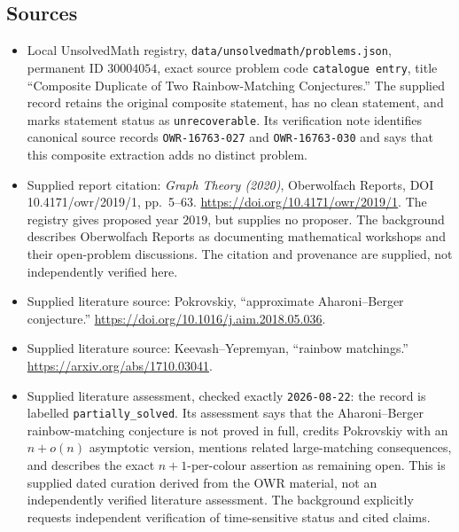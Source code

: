 \documentclass[11pt]{article}
\begin{document}
\subsection{Sources}
\begin{itemize}
\item Local UnsolvedMath registry, \texttt{data/unsolvedmath/problems.json}, permanent ID \(30004054\), exact source problem code \texttt{catalogue entry}, title ``Composite Duplicate of Two Rainbow-Matching Conjectures.'' The supplied record retains the original composite statement, has no clean statement, and marks statement status as \texttt{unrecoverable}. Its verification note identifies canonical source records \texttt{OWR-16763-027} and \texttt{OWR-16763-030} and says that this composite extraction adds no distinct problem.
\item Supplied report citation: \emph{Graph Theory (2020)}, Oberwolfach Reports, DOI 10.4171/owr/2019/1, pp.~5--63. \url{https://doi.org/10.4171/owr/2019/1}. The registry gives proposed year \(2019\), but supplies no proposer. The background describes Oberwolfach Reports as documenting mathematical workshops and their open-problem discussions. The citation and provenance are supplied, not independently verified here.
\item Supplied literature source: Pokrovskiy, ``approximate Aharoni--Berger conjecture.'' \url{https://doi.org/10.1016/j.aim.2018.05.036}.
\item Supplied literature source: Keevash--Yepremyan, ``rainbow matchings.'' \url{https://arxiv.org/abs/1710.03041}.
\item Supplied literature assessment, checked exactly \texttt{2026-08-22}: the record is labelled \texttt{partially\_solved}. Its assessment says that the Aharoni--Berger rainbow-matching conjecture is not proved in full, credits Pokrovskiy with an \(n+o(n)\) asymptotic version, mentions related large-matching consequences, and describes the exact \(n+1\)-per-colour assertion as remaining open. This is supplied dated curation derived from the OWR material, not an independently verified literature assessment. The background explicitly requests independent verification of time-sensitive status and cited claims.
\end{itemize}
\end{document}
